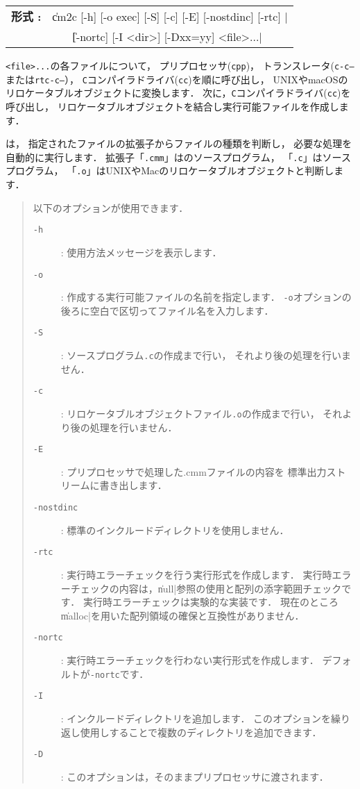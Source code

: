 \begin{flushleft}
\begin{tabular}{l l}
{\bf 形式 : } & \|cm2c [-h] [-o exec] [-S] [-c] [-E] [-nostdinc] [-rtc] | \\
              & ~~~ \| [-nortc] [-I <dir>] [-Dxx=yy] <file>...|
\end{tabular}
\end{flushleft}

{\tt <file>...}の各ファイルについて，
プリプロセッサ({\tt cpp})，
トランスレータ({\tt c-c--}または{\tt rtc-c--}），
{\tt C}コンパイラドライバ({\tt cc})を順に呼び出し，
UNIXやmacOSのリロケータブルオブジェクトに変換します．
次に，{\tt C}コンパイラドライバ({\tt cc})を呼び出し，
リロケータブルオブジェクトを結合し実行可能ファイルを作成します．

{\cmc}は，
指定されたファイルの拡張子からファイルの種類を判断し，
必要な処理を自動的に実行します．
拡張子「{\tt .cmm}」は{\cmml}のソースプログラム，
「{\tt .c}」は{\cl}ソースプログラム，
「{\tt .o}」はUNIXやMacのリロケータブルオブジェクトと判断します．

\begin{quote}
\hspace{-1em}以下のオプションが使用できます．

\begin{description}
\item[{\tt -h}] : 使用方法メッセージを表示します．
\item[{\tt -o}] : 作成する実行可能ファイルの名前を指定します．
{\tt -o}オプションの後ろに空白で区切ってファイル名を入力します．
\item[{\tt -S}] : {\cl}ソースプログラム{\tt .c}の作成まで行い，
  それより後の処理を行いません．
\item[{\tt -c}] : リロケータブルオブジェクトファイル{\tt .o}の作成まで行い，
  それより後の処理を行いません．
\item[{\tt -E}] : プリプロセッサで処理した{.cmm}ファイルの内容を
  標準出力ストリームに書き出します．
\item[{\tt -nostdinc}] : 標準のインクルードディレクトリを使用しません．
\item[{\tt -rtc}] : 実行時エラーチェックを行う実行形式を作成します．
  実行時エラーチェックの内容は，\|null|参照の使用と配列の添字範囲チェックです．
  実行時エラーチェックは実験的な実装です．
  現在のところ\|malloc|を用いた配列領域の確保と互換性がありません．
\item[{\tt -nortc}] : 実行時エラーチェックを行わない実行形式を作成します．
  デフォルトが{\tt -nortc}です．
\item[{\tt -I}] : インクルードディレクトリを追加します．
  このオプションを繰り返し使用しすることで複数のディレクトリを追加できます．
\item[{\tt -D}] : このオプションは，そのままプリプロセッサに渡されます．
\end{description}
\end{quote}


